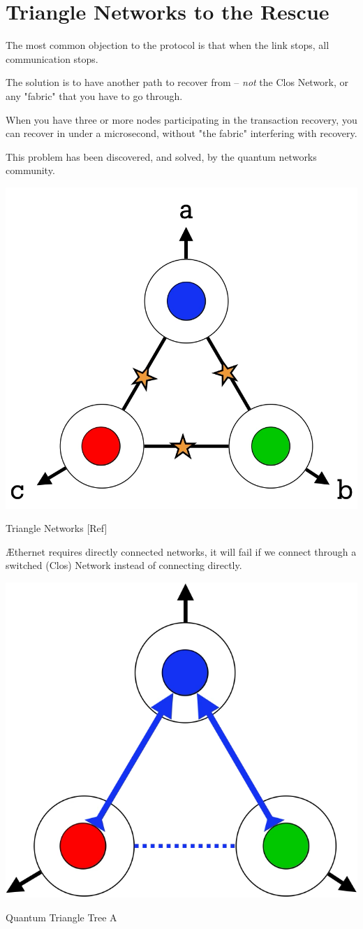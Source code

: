 \documentclass[../HFT-main.tex]{subfiles}
\begin{document}
\section{Triangle Networks to the Rescue}

The most common objection to the \LINK protocol is that when the link stops, all communication stops.

The solution is to have another path to recover  from -- \emph{not}  the Clos Network, or any "fabric" that you have to go through.

When you have three or more nodes participating in the transaction recovery, you can recover in under a microsecond, without "the fabric" interfering with recovery.

This problem has been discovered, and solved, by the quantum networks community. 

\begin{marginfigure}
  \includegraphics[width=0.5\linewidth]{../Figures/Quantum-Triangle.png}
  \caption{Triangle Networks [Ref]}
    \vspace{25pt}
\end{marginfigure}


Æthernet requires directly connected networks, it will fail if we connect through a switched (Clos) Network instead of connecting directly.

\begin{marginfigure}
  \vspace{20pt}
  \includegraphics[width=0.5\linewidth]{../Figures/Quantum-Triangle-A.png}
  \caption{Quantum Triangle Tree A}
  \vspace{10pt}
\end{marginfigure}
\end{document}
